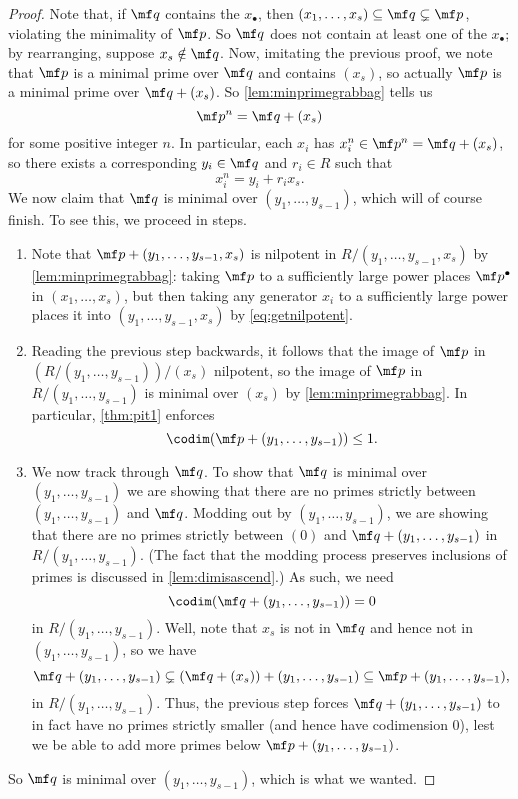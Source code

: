 \begin{proof}
	Note that, if $\mf q$ contains the $x_\bullet$, then $(x_1,\ldots,x_s)\subseteq\mf q\subsetneq\mf p$, violating the minimality of $\mf p$. So $\mf q$ does not contain at least one of the $x_\bullet$; by rearranging, suppose $x_s\notin\mf q$. Now, imitating the previous proof, we note that $\mf p$ is a minimal prime over $\mf q$ and contains $(x_s)$, so actually $\mf p$ is a minimal prime over $\mf q+(x_s)$. So \autoref{lem:minprimegrabbag} tells us
	\[\mf p^n=\mf q+(x_s)\]
	for some positive integer $n$. In particular, each $x_i$ has $x_i^n\in\mf p^n=\mf q+(x_s)$, so there exists a corresponding $y_i\in\mf q$ and $r_i\in R$ such that
	\[x_i^n=y_i+r_ix_s.\tag{$*$}\label{eq:getnilpotent}\]
	We now claim that $\mf q$ is minimal over $(y_1,\ldots,y_{s-1})$, which will of course finish. To see this, we proceed in steps.
	\begin{enumerate}
		\item Note that $\mf p+(y_1,\ldots,y_{s-1},x_s)$ is nilpotent in $R/(y_1,\ldots,y_{s-1},x_s)$ by \autoref{lem:minprimegrabbag}: taking $\mf p$ to a sufficiently large power places $\mf p^\bullet$ in $(x_1,\ldots,x_s)$, but then taking any generator $x_i$ to a sufficiently large power places it into $(y_1,\ldots,y_{s-1},x_s)$ by \autoref{eq:getnilpotent}.
		\item Reading the previous step backwards, it follows that the image of $\mf p$ in $(R/(y_1,\ldots,y_{s-1}))/(x_s)$ nilpotent, so the image of $\mf p$ in $R/(y_1,\ldots,y_{s-1})$ is minimal over $(x_s)$ by \autoref{lem:minprimegrabbag}. In particular, \autoref{thm:pit1} enforces
		\[\codim(\mf p+(y_1,\ldots,y_{s-1}))\le1.\]
		\item We now track through $\mf q$. To show that $\mf q$ is minimal over $(y_1,\ldots,y_{s-1})$ we are showing that there are no primes strictly between $(y_1,\ldots,y_{s-1})$ and $\mf q$. Modding out by $(y_1,\ldots,y_{s-1})$, we are showing that there are no primes strictly between $(0)$ and $\mf q+(y_1,\ldots,y_{s-1})$ in $R/(y_1,\ldots,y_{s-1})$. (The fact that the modding process preserves inclusions of primes is discussed in \autoref{lem:dimisascend}.) As such, we need
		\[\codim(\mf q+(y_1,\ldots,y_{s-1}))=0\]
		in $R/(y_1,\ldots,y_{s-1})$. Well, note that $x_s$ is not in $\mf q$ and hence not in $(y_1,\ldots,y_{s-1})$, so we have
		\[\mf q+(y_1,\ldots,y_{s-1})\subsetneq(\mf q+(x_s))+(y_1,\ldots,y_{s-1})\subseteq\mf p+(y_1,\ldots,y_{s-1}),\]
		in $R/(y_1,\ldots,y_{s-1})$. Thus, the previous step forces $\mf q+(y_1,\ldots,y_{s-1})$ to in fact have no primes strictly smaller (and hence have codimension $0$), lest we be able to add more primes below $\mf p+(y_1,\ldots,y_{s-1})$.
	\end{enumerate}
	So $\mf q$ is minimal over $(y_1,\ldots,y_{s-1})$, which is what we wanted.
\end{proof}
